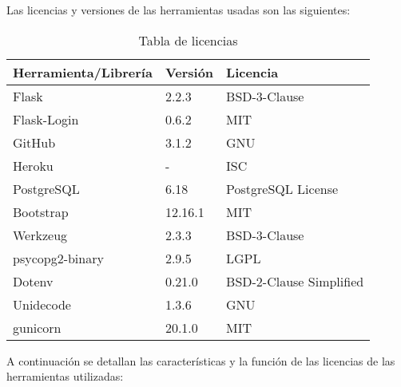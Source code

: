 Las licencias y versiones de las herramientas usadas son las siguientes:
\begin{table}[ht!]
    \centering
    \resizebox{13cm}{!} {
    \begin{tabular}{|l|l|l|}
    \hline
         \textbf{Herramienta/Librería}     &  \textbf{Versión}   &\textbf{Licencia} \\ \hline
         {Flask}       & {2.2.3 }  &{BSD-3-Clause} \\ \hline
         {Flask-Login}       & {0.6.2}  &{MIT} \\ \hline
         {GitHub}       & {3.1.2}    &{GNU} \\ \hline 
         {Heroku}       & {-}    &{ISC} \\ \hline 
         {PostgreSQL}       & {6.18 }    &{PostgreSQL License} \\ \hline 
         {Bootstrap}       & {12.16.1}    &{MIT} \\ \hline 
         {Werkzeug}       & {2.3.3}    &{BSD-3-Clause} \\ \hline 
         {psycopg2-binary}       & {2.9.5 }    &{LGPL} \\ \hline 
         {Dotenv}       & {0.21.0 }    &{BSD-2-Clause Simplified} \\ \hline 
         {Unidecode}       & {1.3.6}    &{GNU} \\ \hline 
         {gunicorn}       & {20.1.0}    &{MIT} \\ \hline 
    \end{tabular}}
    \caption{Tabla de licencias}
    \label{tab:licencias}
\end{table}

A continuación se detallan las características y la función de las licencias de las herramientas utilizadas:

